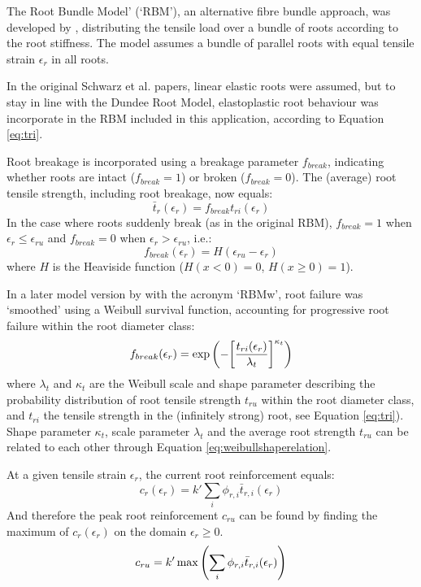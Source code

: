 \documentclass[a4 paper, 11  pt]{article}
\begin{document}
The Root Bundle Model' (`RBM'), an alternative fibre bundle approach, was developed by \citet{schwarz2010}, distributing the tensile load over a bundle of roots according to the root stiffness. The model assumes a bundle of parallel roots with equal tensile strain $\epsilon_r$ in all roots. 

In the original Schwarz et al. papers, linear elastic roots were assumed, but to stay in line with the Dundee Root Model, elastoplastic root behaviour was incorporate in the RBM included in this application, according to Equation \ref{eq:tri}.

Root breakage is incorporated using a breakage parameter $f_{break}$,  indicating whether roots are intact ($f_{break}=1$) or broken ($f_{break}=0$). The (average) root tensile strength, including root breakage, now equals:
\begin{equation}
	\bar{t}_r(\epsilon_r) = f_{break} t_{ri}(\epsilon_r)
\end{equation}
In the case where roots suddenly break (as in the original RBM), $f_{break}=1$ when $\epsilon_r \leq \epsilon_{ru}$ and $f_{break}=0$ when $\epsilon_r > \epsilon_{ru}$, i.e.:
\begin{equation}
	f_{break}(\epsilon_r) = H(\epsilon_{ru} - \epsilon_{r})
\end{equation}
where $H$ is the Heaviside function ($H(x<0)=0$, $H(x\geq0)=1$).

In a later model version by \citet{schwarz2013} with the acronym `RBMw', root failure was `smoothed' using a Weibull survival function, accounting for progressive root failure within the root diameter class:
\begin{equation}
	f_{break}(\epsilon_r) = \exp \qty( - \qty[ \frac{t_{ri}(\epsilon_r)}{\lambda_t} ]^{
	\kappa_t} )
\end{equation}
where $\lambda_t$ and $\kappa_t$ are the Weibull scale and shape parameter describing the probability distribution of root tensile strength $t_{ru}$ within the root diameter class, and $t_{ri}$ the tensile strength in the (infinitely strong) root, see Equation \ref{eq:tri}). Shape parameter $\kappa_t$, scale parameter $\lambda_t$ and the average root strength $t_{ru}$ can be related to each other through Equation \ref{eq:weibullshaperelation}.

At a given tensile strain $\epsilon_r$, the current root reinforcement equals:
\begin{equation}
	c_{r}(\epsilon_r) = k' \sum_i \phi_{r,i} \bar{t}_{r,i}(\epsilon_r) 
\end{equation}
And therefore the peak root reinforcement $c_{ru}$ can be found by finding the maximum of $c_{r}(\epsilon_r)$ on the domain $\epsilon_r \geq 0$.
\begin{equation}
	c_{ru} = k' \max \qty( \sum_i \phi_{r,i} \bar{t}_{r,i}(\epsilon_r)  )
\end{equation}
\end{document}
